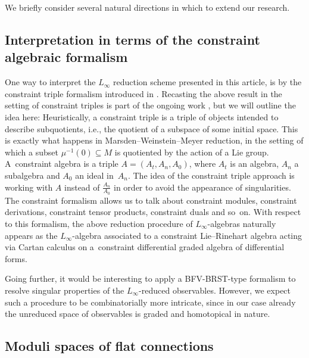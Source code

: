 \documentclass[pdftex]{sigma}
\numberwithin{equation}{section}
\renewcommand{\subset}{\subseteq}
\begin{document}
We briefly consider several natural directions in which to extend our research.

\subsection{Interpretation in terms of the constraint algebraic formalism}

One way to interpret the $L_\infty$ reduction scheme presented in this article, is by the constraint triple formalism introduced
in \cite{DippelEspositoWaldmann2019}. Recasting the above result in the setting of constraint triples is part of the ongoing work \cite{ongoing}, but we will outline the idea here: Heuristically, a constraint triple is a triple of objects intended to describe subquotients, i.e., the quotient of a subspace of some initial space. This is exactly what happens in Marsden--Weinstein--Meyer reduction, in the setting of which a subset $\mu^{-1}(0)\subset M$ is quotiented by the action of a Lie group. A~constraint algebra is a triple $A = (A_t , A_n , A_0)$, where $A_t$ is
an algebra, $A_n$ a subalgebra and $A_0$ an ideal in~$A_n$.  The idea of the constraint triple
approach is working with $A$ instead of $\frac{A_n}{A_0}$ in order to avoid the appearance of singularities.
The constraint formalism allows us to talk about constraint modules, constraint derivations,
constraint tensor products, constraint duals and so~on. With respect to this formalism, the
above reduction procedure of $L_\infty$-algebras naturally appears as the $L_\infty$-algebra associated
to a constraint Lie--Rinehart algebra acting via Cartan calculus on a~constraint differential
graded algebra of differential forms.

Going further, it would be interesting to apply a BFV-BRST-type formalism to resolve singular properties of the $L_\infty$-reduced observables. However, we expect such a procedure to be combinatorially more intricate, since in our case already the unreduced space of observables is graded and homotopical in nature.

\subsection{Moduli spaces of flat connections}%
\end{document}

